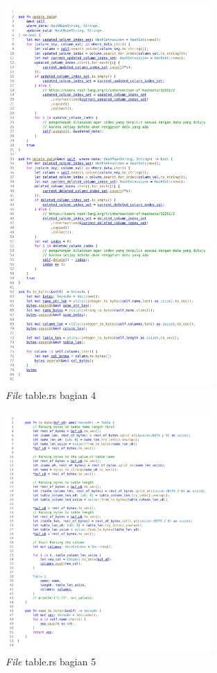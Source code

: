 \begin{figure}[H]
  \centering{}
	\includegraphics[width=0.7\textwidth]{gambar/lampiran/file-table-4.png}
  \caption{\emph{File} table.rs bagian 4}
\end{figure}

\begin{figure}[H]
  \centering{}
	\includegraphics[width=0.7\textwidth]{gambar/lampiran/file-table-5.png}
  \caption{\emph{File} table.rs bagian 5}
\end{figure}

